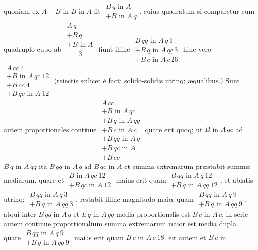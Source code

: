 \documentclass[11pt,a4paper]{article}
\begin{document}
quoniam ex $A + B$ in $B$ in $A$ fit $\begin{array}{l} B\,q \text{ in } A \\ + B \text{ in } A\,q \end{array}$. cuius quadratum si comparetur   cum quadruplo cubo ab $\dfrac{\begin{array}{l} A\,q \\ + B\,q \\ + B \text{ in } A \end{array}}{3}$ fiunt illinc $\begin{array}{l} B\,qq \text{ in } A\,q\ 3 \\ + B\,q \text{ in } A\,qq\ 3 \\ + B\,c \text{ in } A\,c\ 26 \end{array}$ hinc vero $\begin{array}{l} A\,cc\ 4 \\ + B \text{ in } A\,qc\ 12 \\ + B\,cc\ 4 \\ + B\,qc \text{ in } A\ 12 \end{array}$ (reiectis scilicet è facti solido-solidis \struck{\ill{}} utrinq; æqualibus.) Sunt autem proportionales continue $\begin{array}{l} A\,cc \\ + B \text{ in } A\,qc \\ + B\,q \text{ in } A\,qq \\ + B\,c \text{ in } A\,c \\ + B\,qq \text{ in } A\,q \\ + B\,qc \text{ in } A \\ + B\,cc \end{array}$ quare erit quoq; ut $B$ in $A\,qc$ ad $B\,q$ in $A\,qq$ ita $B\,qq$ in $A\,q$ ad $B\,qc$ in $A$ et summa extremarum præstabit summæ mediarum. quare et $\begin{array}{l} B \text{ in } A\,qc\ 12 \\ + B\,qc \text{ in } A\ 12 \end{array}$ maius erit quam $\begin{array}{l} B\,qq \text{ in } A\,q\ 12 \\ + B\,q \text{ in } A\,qq\ 12 \end{array}$. et ablatis utrinq; $\begin{array}{l} B\,qq \text{ in } A\,q\ 3 \\ + B\,q \text{ in } A\,qq\ 3 \end{array}$. restabit illinc magnitudo maior quam $\begin{array}{l} B\,qq \text{ in } A\,q\ 9 \\ + B\,q \text{ in } A\,qq\ 9 \end{array}$. atqui inter $B\,qq$ in $A\,q$ et $B\,q$ in $A\,qq$ media proportionalis est $B\,c$ in $A\,c$. in serie autem continue proportionalium summa extremarum maior est media dupla. quare $\begin{array}{l} B\,qq \text{ in } A\,q\ 9 \\ + B\,q \text{ in } A\,qq\ 9 \end{array}$ maius erit quam $B\,c$ in $A\,c\ 18$. est autem et $B\,c$ in 
\end{document}
